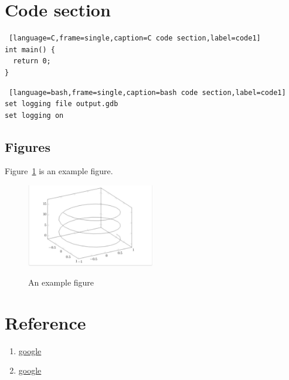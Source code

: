 \section{Code section}
\begin{lstlisting} [language=C,frame=single,caption=C code section,label=code1]
int main() {
  return 0;
}
\end{lstlisting}

\begin{lstlisting} [language=bash,frame=single,caption=bash code section,label=code1]
set logging file output.gdb
set logging on
\end{lstlisting}

\subsection{Figures}%
\label{sub:figures}

Figure~\ref{fig:Example} is an example figure.


\begin{figure}[h]
\caption{An example figure}
\centering
\includegraphics[width=0.5\textwidth]{./template/figure.pdf}
\label{fig:Example}
\end{figure}

\section{Reference}

\begin{enumerate}
  \item \href{https://www.google.com/}{google}
  \item \href{https://www.google.com/}{google}
\end{enumerate}
